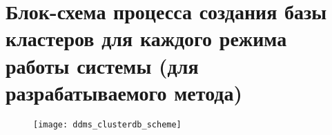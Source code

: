\chapter{Блок-схема процесса создания базы кластеров для каждого режима работы системы (для разрабатываемого метода)}
\label{app:DDMS:ClusterDBScheme}
\begin{figure}[H]
\texttt{[image: ddms\_clusterdb\_scheme]}
\end{figure}